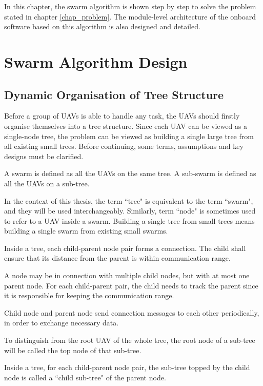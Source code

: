 In this chapter, the swarm algorithm is shown step by step
to solve the problem stated in chapter \ref{chap_problem}.
The module-level architecture of the onboard software based on this algorithm
is also designed and detailed.

\section{Swarm Algorithm Design}
\label{sec:alg_design}

\subsection{Dynamic Organisation of Tree Structure}

Before a group of UAVs is able to handle any task,
the UAVs should firstly organise themselves into a tree structure.
Since each UAV can be viewed as a single-node tree,
the problem can be viewed as building a single large tree from all existing small trees.
Before continuing, some terms, assumptions and key designs must be clarified.
\begin{remark}
    A swarm is defined as all the UAVs on the same tree.
    A sub-swarm is defined as all the UAVs on a sub-tree.
\end{remark}
In the context of this thesis, the term ``tree" is equivalent to the term ``swarm",
and they will be used interchangeably.
Similarly, term ``node" is sometimes used to refer to a UAV inside a swarm.
Building a single tree from small trees means building a single swarm from existing small swarms.
\begin{remark}
    Inside a tree, each child-parent node pair forms a connection.
    The child shall ensure that its distance from the parent is within communication range.
\end{remark}
A node may be in connection with multiple child nodes, but with at most one parent node.
For each child-parent pair, the child needs to track the parent
since it is responsible for keeping the communication range.
\begin{remark}
    Child node and parent node send connection messages to each other periodically,
    in order to exchange necessary data.
\end{remark}
To distinguish from the root UAV of the whole tree,
the root node of a sub-tree will be called the top node of that sub-tree.
\begin{remark}
    Inside a tree, for each child-parent node pair,
    the sub-tree topped by the child node is called a ``child sub-tree" of the parent node.
\end{remark}
